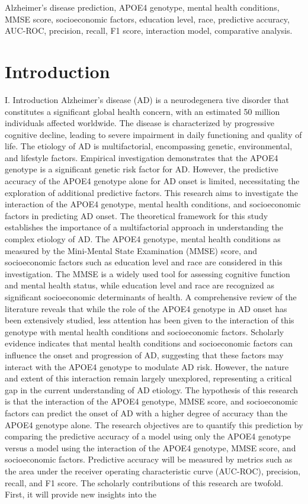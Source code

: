 \documentclass[conference]{IEEEtran}
\begin{document}
\begin{IEEEkeywords}
Alzheimer's disease prediction, APOE4 genotype, mental health conditions, MMSE score, socioeconomic factors, education level, race, predictive accuracy, AUC-ROC, precision, recall, F1 score, interaction model, comparative analysis.
\end{IEEEkeywords}

\section{Introduction}
I. Introduction Alzheimer's disease (AD) is a neurodegenera tive disorder that constitutes a significant global health concern, with an estimated 50 million individuals affected worldwide. The disease is characterized by progressive cognitive decline, leading to severe impairment in daily functioning and quality of life. The etiology of AD is multifactorial, encompassing genetic, environmental, and lifestyle factors. Empirical investigation demonstrates that the APOE4 genotype is a significant genetic risk factor for AD. However, the predictive accuracy of the APOE4 genotype alone for AD onset is limited, necessitating the exploration of additional predictive factors. This research aims to investigate the interaction of the APOE4 genotype, mental health conditions, and socioeconomic factors in predicting AD onset. The theoretical framework for this study establishes the importance of a multifactorial approach in understanding the complex etiology of AD. The APOE4 genotype, mental health conditions as measured by the Mini-Mental State Examination (MMSE) score, and socioeconomic factors such as education level and race are considered in this investigation. The MMSE is a widely used tool for assessing cognitive function and mental health status, while education level and race are recognized as significant socioeconomic determinants of health. A comprehensive review of the literature reveals that while the role of the APOE4 genotype in AD onset has been extensively studied, less attention has been given to the interaction of this genotype with mental health conditions and socioeconomic factors. Scholarly evidence indicates that mental health conditions and socioeconomic factors can influence the onset and progression of AD, suggesting that these factors may interact with the APOE4 genotype to modulate AD risk. However, the nature and extent of this interaction remain largely unexplored, representing a critical gap in the current understanding of AD etiology. The hypothesis of this research is that the interaction of the APOE4 genotype, MMSE score, and socioeconomic factors can predict the onset of AD with a higher degree of accuracy than the APOE4 genotype alone. The research objectives are to quantify this prediction by comparing the predictive accuracy of a model using only the APOE4 genotype versus a model using the interaction of the APOE4 genotype, MMSE score, and socioeconomic factors. Predictive accuracy will be measured by metrics such as the area under the receiver operating characteristic curve (AUC-ROC), precision, recall, and F1 score. The scholarly contributions of this research are twofold. First, it will provide new insights into the 
\end{document}
